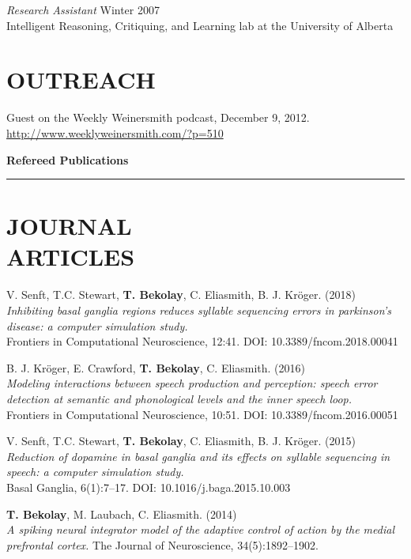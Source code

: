 \documentclass[line,margin]{res}
\begin{document}
\begin{resume}
{\sl Research Assistant} \hfill Winter 2007 \\
Intelligent Reasoning, Critiquing, and Learning lab at the University of Alberta

\section{OUTREACH}

Guest on the Weekly Weinersmith podcast, December 9, 2012. \\
\url{http://www.weeklyweinersmith.com/?p=510}

{\Large \bf Refereed Publications} \\ \vspace{-8pt} \hrule

\section{JOURNAL \\ARTICLES}

V. Senft, T.C. Stewart, \textbf{T. Bekolay}, C. Eliasmith,
B. J. Kr\"{o}ger. (2018) \\
  {\sl Inhibiting basal ganglia regions reduces syllable sequencing errors
    in parkinson's disease: a computer simulation study.} \\
  Frontiers in Computational Neuroscience, 12:41.
  DOI: 10.3389/fncom.2018.00041

B. J. Kr\"{o}ger, E. Crawford, \textbf{T. Bekolay}, C. Eliasmith. (2016) \\
  {\sl Modeling interactions between speech production and perception:
  speech error detection at semantic and phonological levels
  and the inner speech loop.} \\
  Frontiers in Computational Neuroscience, 10:51.
  DOI: 10.3389/fncom.2016.00051

V. Senft, T.C. Stewart, \textbf{T. Bekolay}, C. Eliasmith,
B. J. Kr\"{o}ger. (2015) \\
  {\sl Reduction of dopamine in basal ganglia and its effects on
    syllable sequencing in speech: a computer simulation study.} \\
  Basal Ganglia, 6(1):7--17. DOI: 10.1016/j.baga.2015.10.003

\textbf{T. Bekolay}, M. Laubach, C. Eliasmith. (2014) \\
  {\sl A spiking neural integrator model of the adaptive control of action
  by the medial prefrontal cortex.}
  The Journal of Neuroscience, 34(5):1892--1902.


\end{resume}
\end{document}
